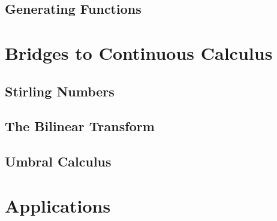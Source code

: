 




\subsection{Generating Functions}




\section{Bridges to Continuous Calculus}


\subsection{Stirling Numbers}



\subsection{The Bilinear Transform}


\subsection{Umbral Calculus}











\section{Applications}

